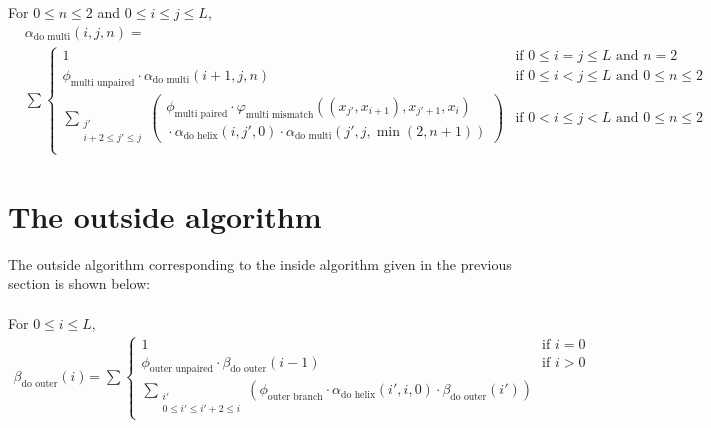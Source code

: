 \documentclass{article}
\newcommand{\Bdoouter}{\beta_\text{do outer}}
\newcommand{\outerunpaired}{\phi_\text{outer unpaired}}
\newcommand{\outerbranch}{\phi_\text{outer branch}}
\newcommand{\multimismatch}{\varphi_\text{multi mismatch}}
\newcommand{\Adomulti}{\alpha_\text{do multi}}
\newcommand{\multiunpaired}{\phi_\text{multi unpaired}}
\newcommand{\multipaired}{\phi_\text{multi paired}}
\newcommand{\Adohelix}{\alpha_\text{do helix}}
\begin{document}
  \noindent
  For $0 \le n \le 2$ and $0 \le i \le j \le L$,
  \begin{align*}
    &\Adomulti(i,j,n) = \\
    &\sum \begin{cases}
      1 & \text{if $0 \le i=j \le L$ and $n=2$} \\
      \multiunpaired \cdot \Adomulti(i+1,j,n) & \text{if $0 \le i < j \le L$ and $0 \le n \le 2$} \\
      \displaystyle \sum_{\substack{j' \\ i+2 \le j' \le j}} 
      \left(
      \begin{matrix}
	\multipaired \cdot \multimismatch((x_{j'},x_{i+1}),x_{j'+1},x_i) \\
	{} \cdot \Adohelix(i,j',0) \cdot \Adomulti(j',j,\min(2,n+1))
      \end{matrix}
      \right) & \text{if $0 < i \le j < L$ and $0 \le n \le 2$} \\
    \end{cases}
  \end{align*}

  \newpage
  \section{The outside algorithm}
  \label{sec:outside}

  The outside algorithm corresponding to the inside algorithm given in the previous section
  is shown below: \\
  \\ 
  \noindent
  For $0 \le i \le L$,
  \begin{align*}
    \Bdoouter(i) &= \sum \begin{cases}
      1 & \text{if $i=0$} \\
      \outerunpaired \cdot \Bdoouter(i-1) & \text{if $i > 0$} \\
      \displaystyle \sum_{\substack{i' \\ 0 \le i' \le i'+2 \le i}} \left(\outerbranch \cdot \Adohelix(i',i,0) \cdot \Bdoouter(i')\right)
    \end{cases}
  \end{align*} 
\end{document}
